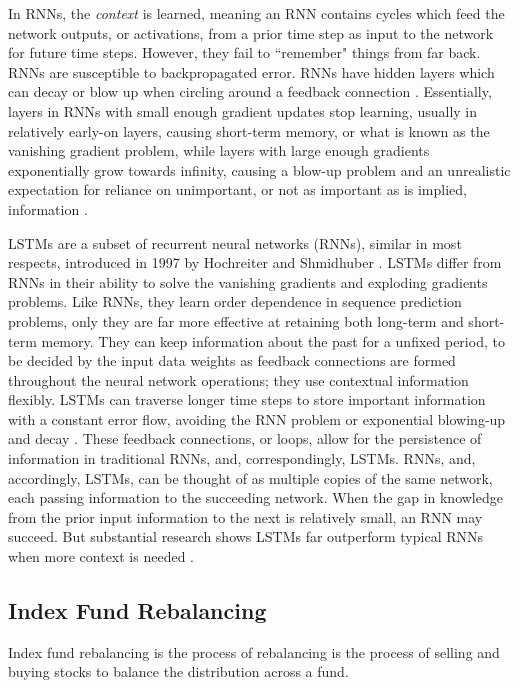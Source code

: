 \documentclass[10pt,twocolumn]{article}
\begin{document}
In RNNs, the \emph{context} is learned, meaning an RNN contains cycles which feed the network outputs, or activations, from a prior time step as input to the network for future time steps. However, they fail to ``remember" things from far back. RNNs are susceptible to backpropagated error. RNNs have hidden layers which can decay or blow up when circling around a feedback connection \cite{GentleIntroductionToLSTMNetworks}. Essentially, layers in RNNs with small enough gradient updates stop learning, usually in relatively early-on layers, causing short-term memory, or what is known as the vanishing gradient problem, while layers with large enough gradients exponentially grow towards infinity, causing a blow-up problem and an unrealistic expectation for reliance on unimportant, or not as important as is implied, information \cite{IllustratedGuideToLSTMs}.

LSTMs are a subset of recurrent neural networks (RNNs), similar in most respects, introduced in 1997 by Hochreiter and Shmidhuber \cite{UnderstandingLSTMs}. LSTMs differ from RNNs in their ability to solve the vanishing gradients and exploding gradients problems. Like RNNs, they learn order dependence in sequence prediction problems, only they are far more effective at retaining both long-term and short-term memory. They can keep information about the past for a unfixed period, to be decided by the input data weights as feedback connections are formed throughout the neural network operations; they use contextual information flexibly. LSTMs can traverse longer time steps to store important information with a constant error flow, avoiding the RNN problem or exponential blowing-up and decay \cite{GentleIntroductionToLSTMNetworks}. These feedback connections, or loops, allow for the persistence of information in traditional RNNs, and, correspondingly, LSTMs. RNNs, and, accordingly, LSTMs, can be thought of as multiple copies of the same network, each passing information to the succeeding network. When the gap in knowledge from the prior input information to the next is relatively small, an RNN may succeed. But substantial research shows LSTMs far outperform typical RNNs when more context is needed \cite{UnderstandingLSTMs}.

\subsection{Index Fund Rebalancing}

Index fund rebalancing is the process of rebalancing is the process of selling and buying stocks to balance the distribution across a fund.
\end{document}
